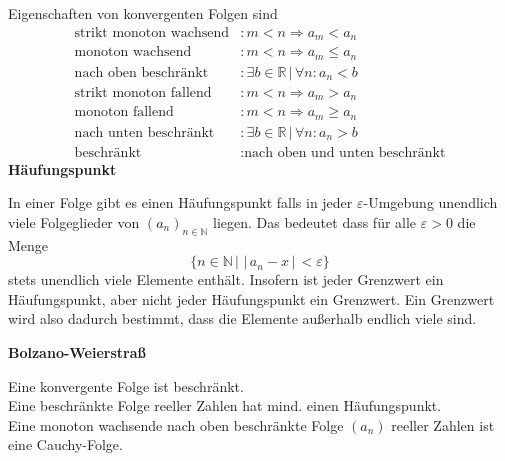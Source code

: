 \documentclass[a4paper,12pt]{article}
\numberwithin{equation}{section}
\begin{document}
Eigenschaften von konvergenten Folgen sind
\begin{align*}
        \text{strikt monoton wachsend}&: m<n\Rightarrow a_m<a_n \\
        \text{monoton wachsend}&: m<n\Rightarrow a_m\leq a_n \\
        \text{nach oben beschränkt}&: \exists b \in \mathbb{R}\,|\, \forall n:a_n<b \\
        \text{strikt monoton fallend}&: m<n\Rightarrow a_m>a_n \\
        \text{monoton fallend}&: m<n\Rightarrow a_m\geq a_n \\
        \text{nach unten beschränkt}&: \exists b \in \mathbb{R}\,|\, \forall n:a_n>b \\
        \text{beschränkt}&: \text{nach oben und unten beschränkt}
\end{align*}
\textbf{Häufungspunkt}
\begin{center}
In einer Folge gibt es einen Häufungspunkt falls in jeder $\varepsilon $-Umgebung unendlich viele Folgeglieder von $\left(a_n\right)_{n  \in \mathbb{N}}$ liegen. Das bedeutet dass für alle $\varepsilon >0$ die Menge 
\[
        \{n  \in \mathbb{N}\,|\, \,|\, a_n-x\,|\, <\varepsilon \}
\]
stets unendlich viele Elemente enthält. Insofern ist jeder Grenzwert ein Häufungspunkt, aber nicht jeder Häufungspunkt ein Grenzwert. Ein Grenzwert wird also dadurch bestimmt, dass die Elemente außerhalb endlich viele sind.
\end{center}
\textbf{Bolzano-Weierstraß}
\begin{center}
Eine konvergente Folge ist beschränkt.\\Eine beschränkte Folge reeller Zahlen hat mind. einen Häufungspunkt.\\Eine monoton wachsende nach oben beschränkte Folge $\left(a_n\right)$ reeller Zahlen ist eine Cauchy-Folge.
\end{center}
\end{document}
